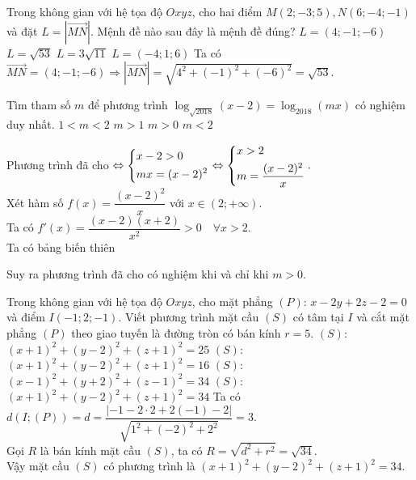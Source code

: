 \begin{ex}%
Trong không gian với hệ tọa độ $Oxyz$, cho hai điểm $M(2;-3;5), N(6;-4;-1)$ và đặt $L= \left|\vec{MN}\right|.$ Mệnh đề nào sau đây là mệnh đề đúng?
\choice
{$L=(4;-1;-6)$}
{\True $L= \sqrt{53}$}
{$L=3 \sqrt{11}$}
{$L=(-4;1;6)$}
\loigiai
{ Ta có $\vec{MN} =(4;-1;-6) \Rightarrow \left|\vec{MN} \right| =\sqrt{4^2+(-1)^2+(-6)^2} =\sqrt{53}.$
}
\end{ex}
\begin{ex}%
Tìm tham số $m$ để phương trình $\log _{\sqrt{2018}}(x-2)= \log _{2018}(mx)$ có nghiệm duy nhất.
\choice
{$1<m<2$}
{$m>1$}
{\True $m>0$}
{$m<2$}
\loigiai
{ Phương trình đã cho $\Leftrightarrow \left\{\begin{aligned}& x-2>0 \\& mx=(x-2)^2\end{aligned}\right. \Leftrightarrow \left\{\begin{aligned}&x>2\\& m=\dfrac{(x-2)^2}{x}\end{aligned}\right..$\\
Xét hàm số $f(x)= \dfrac{(x-2)^2}{x}$ với $x \in (2; + \infty)$.\\
Ta có $f'(x)= \dfrac{(x-2)(x+2)}{x^2} >0 \quad \forall x >2.$ \\
Ta có bảng biến thiên
\begin{center}
\end{center}
Suy ra phương trình đã cho có nghiệm khi và chỉ khi $m>0.$
}
\end{ex}
\begin{ex}%
Trong không gian với hệ tọa độ $Oxyz$, cho mặt phẳng $(P)$: $x-2y+2z-2=0$ và điểm $I(-1;2;-1)$. Viết phương trình mặt cầu $(S)$ có tâm tại $I$ và cắt mặt phẳng $(P)$ theo giao tuyến là đường tròn có bán kính $ r=5.$
\choice
{$(S)$: $(x+1)^2+(y-2)^2+(z+1)^2=25$}
{$(S)$: $(x+1)^2+(y-2)^2+(z+1)^2=16$}
{$(S)$: $(x-1)^2+(y+2)^2+(z-1)^2=34$}
{\True $(S)$: $(x+1)^2+(y-2)^2+(z+1)^2=34$}
\loigiai
{ Ta có $d(I;(P))= d = \dfrac{|-1-2 \cdot 2 +2(-1)-2|}{\sqrt{1^2+(-2)^2+2^2}} = 3$.\\
Gọi $R$ là bán kính mặt cầu $(S)$, ta có $R= \sqrt{d^2+r^2}= \sqrt{34}$.\\
Vậy mặt cầu $(S)$ có phương trình là $(x+1)^2+(y-2)^2+(z+1)^2=34$.
}
\end{ex}
